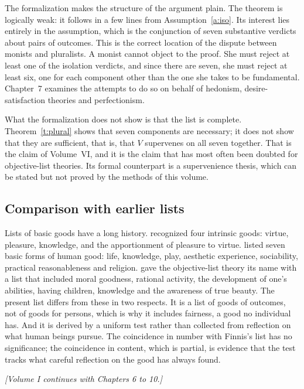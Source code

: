 \documentclass{situationist-preprint}
\begin{document}
The formalization makes the structure of the argument plain. The theorem is logically weak: it follows in a few lines from Assumption~\ref{a:iso}. Its interest lies entirely in the assumption, which is the conjunction of seven substantive verdicts about pairs of outcomes. This is the correct location of the dispute between monists and pluralists. A monist cannot object to the proof. She must reject at least one of the isolation verdicts, and since there are seven, she must reject at least six, one for each component other than the one she takes to be fundamental. Chapter~7 examines the attempts to do so on behalf of hedonism, desire-satisfaction theories and perfectionism.

What the formalization does not show is that the list is complete. Theorem~\ref{t:plural} shows that seven components are necessary; it does not show that they are sufficient, that is, that $V$ supervenes on all seven together. That is the claim of Volume~VI, and it is the claim that has most often been doubted for objective-list theories. Its formal counterpart is a supervenience thesis, which can be stated but not proved by the methods of this volume.

\subsection*{Comparison with earlier lists}

Lists of basic goods have a long history. \citet{Ross1930} recognized four intrinsic goods: virtue, pleasure, knowledge, and the apportionment of pleasure to virtue. \citet{Finnis1980} listed seven basic forms of human good: life, knowledge, play, aesthetic experience, sociability, practical reasonableness and religion. \citet{Parfit1984} gave the objective-list theory its name with a list that included moral goodness, rational activity, the development of one's abilities, having children, knowledge and the awareness of true beauty. The present list differs from these in two respects. It is a list of goods of outcomes, not of goods for persons, which is why it includes fairness, a good no individual has. And it is derived by a uniform test rather than collected from reflection on what human beings pursue. The coincidence in number with Finnis's list has no significance; the coincidence in content, which is partial, is evidence that the test tracks what careful reflection on the good has always found.

\bigskip
\begin{center}\small\itshape [Volume I continues with Chapters 6 to 10.]\end{center}
\end{document}
